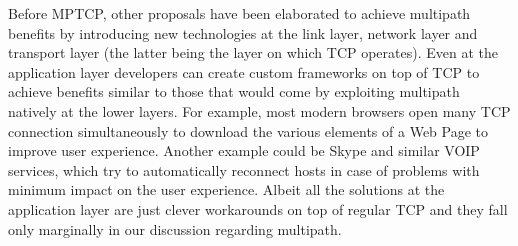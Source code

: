 Before MPTCP, other proposals have been elaborated to achieve multipath benefits by introducing new technologies at the link layer, network layer and transport layer (the latter being the layer on which TCP operates). Even at the application layer developers can create custom frameworks on top of TCP to achieve benefits similar to those that would come by exploiting multipath natively at the lower layers. For example, most modern browsers open many TCP connection simultaneously to download the various elements of a Web Page to improve user experience. Another example could be Skype and similar VOIP services, which try to automatically reconnect hosts in case of problems with minimum impact on the user experience. Albeit all the solutions at the application layer are just clever workarounds on top of regular TCP and they fall only marginally in our discussion regarding multipath.

